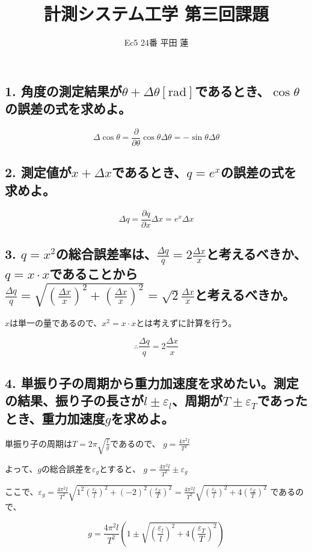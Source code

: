 \documentclass{jsarticle}
\title{計測システム工学 第三回課題}
\author{Ec5 24番 平田 蓮}
\date{}
\begin{document}
\maketitle
\subsection*{1. 角度の測定結果が$\theta + \Delta\theta [\mathrm{rad}]$であるとき、$\cos\theta$の誤差の式を求めよ。}
    \begin{equation*}
        \Delta\cos\theta = \frac{\partial}{\partial\theta}\cos\theta\Delta\theta = -\sin\theta\Delta\theta
    \end{equation*}

\subsection*{2. 測定値が$x + \Delta x$であるとき、$q = e^x$の誤差の式を求めよ。}
    \begin{equation*}
        \Delta q = \frac{\partial q}{\partial x}\Delta x = e^x\Delta x
    \end{equation*}

\subsection*{3. $q=x^2$の総合誤差率は、$\displaystyle\frac{\Delta q}{q} = 2\frac{\Delta x}{x}$と考えるべきか、$q = x \cdot x$であることから$\displaystyle\frac{\Delta q}{q} = \sqrt{\left(\frac{\Delta x}{x}\right)^2 + \left(\frac{\Delta x}{x}\right)^2}=\sqrt{2}\frac{\Delta x}{x}$と考えるべきか。}
    $x$は単一の量であるので、$x^2 = x \cdot x$とは考えずに計算を行う。

    \begin{equation*}
        \therefore \displaystyle\frac{\Delta q}{q} = 2\frac{\Delta x}{x}
    \end{equation*}

\subsection*{4. 単振り子の周期から重力加速度を求めたい。測定の結果、振り子の長さが$l\pm\varepsilon_l$、周期が$T\pm\varepsilon_T$であったとき、重力加速度$g$を求めよ。}
    単振り子の周期は$\displaystyle T = 2\pi\sqrt{\frac{l}{g}}$であるので、
    $\displaystyle g = \frac{4\pi^2l}{T^2}$

    よって、$g$の総合誤差を$\varepsilon_g$とすると、
    $\displaystyle g = \frac{4\pi^2l}{T^2}\pm\varepsilon_g$

    ここで、$\displaystyle\varepsilon_g = \frac{4\pi^2l}{T^2}\sqrt{1^2\left(\frac{\varepsilon_l}{l}\right)^2+(-2)^2\left(\frac{\varepsilon_T}{T}\right)^2}=\frac{4\pi^2l}{T^2}\sqrt{\left(\frac{\varepsilon_l}{l}\right)^2+4\left(\frac{\varepsilon_T}{T}\right)^2}$
    であるので、

    \begin{equation*}
        g = \frac{4\pi^2l}{T^2}\left(1\pm\sqrt{\left(\frac{\varepsilon_l}{l}\right)^2+4\left(\frac{\varepsilon_T}{T}\right)^2}\right)
    \end{equation*}
\end{document}
